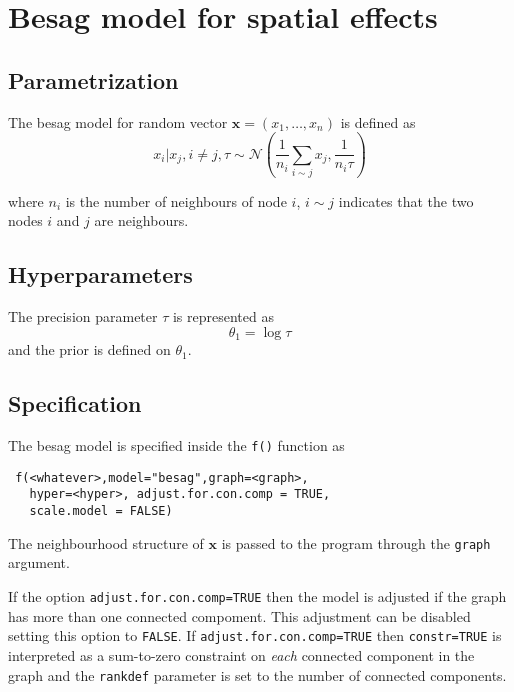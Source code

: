 \documentclass[a4paper,11pt]{article}
\begin{document}
\section*{Besag model for spatial effects}

\subsection*{Parametrization}

The besag model for random vector $\mathbf{x}=(x_1,\dots,x_n)$ is defined as
\begin{equation}\label{eq.besag}
    x_i|x_j,i\neq j,\tau\sim\mathcal{N}(\frac{1}{n_i}\sum_{i\sim j}x_j,\frac{1}{n_i\tau})
\end{equation}

where $n_i$ is the number of neighbours of node $i$, $i\sim j$
indicates that the two nodes $i$ and $j$ are neighbours.  


\subsection*{Hyperparameters}

The precision parameter $\tau$ is represented as
\begin{displaymath}
    \theta_{1} =\log \tau
\end{displaymath}
and the prior is defined on $\theta_{1}$. 

\subsection*{Specification}

The besag model is specified inside the {\tt f()} function as
\begin{verbatim}
 f(<whatever>,model="besag",graph=<graph>,
   hyper=<hyper>, adjust.for.con.comp = TRUE,
   scale.model = FALSE)
\end{verbatim}

The neighbourhood structure of $\mathbf{x}$ is passed to the program
through the {\tt graph} argument.

If the option \verb|adjust.for.con.comp=TRUE| then the model is
adjusted if the graph has more than one connected compoment. This
adjustment can be disabled setting this option to \texttt{FALSE}. If
\verb|adjust.for.con.comp=TRUE| then \texttt{constr=TRUE} is
interpreted as a sum-to-zero constraint on \emph{each} connected
component in the graph and the \texttt{rankdef} parameter is set to
the number of connected components.
\end{document}
